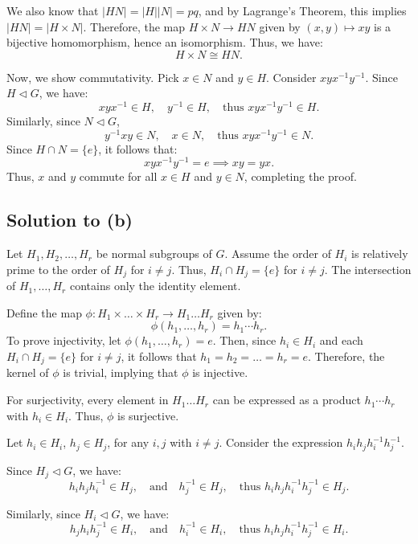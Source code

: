 \documentclass[12pt]{article}
\begin{document}
We also know that \( |HN| = |H||N| = pq \), and by Lagrange's Theorem, this implies \( |HN| = |H \times N| \). Therefore, the map \( H \times N \to HN \) given by \( (x, y) \mapsto xy \) is a bijective homomorphism, hence an isomorphism. Thus, we have:
\[
H \times N \cong HN.
\]

Now, we show commutativity. Pick \( x \in N \) and \( y \in H \). Consider \( xyx^{-1}y^{-1} \). Since \( H \triangleleft G \), we have:
\[
xyx^{-1} \in H, \quad y^{-1} \in H, \quad \text{thus } xyx^{-1}y^{-1} \in H.
\]
Similarly, since \( N \triangleleft G \), 
\[
y^{-1}xy \in N, \quad x \in N, \quad \text{thus } xyx^{-1}y^{-1} \in N.
\]
Since \( H \cap N = \{e\} \), it follows that:
\[
xyx^{-1}y^{-1} = e \implies xy = yx.
\]
Thus, \( x \) and \( y \) commute for all \( x \in H \) and \( y \in N \), completing the proof.

\subsection*{Solution to (b)}
Let \( H_1, H_2, \ldots, H_r \) be normal subgroups of \( G \). Assume the order of \( H_i \) is relatively prime to the order of \( H_j \) for \( i \neq j \). Thus, \( H_i \cap H_j = \{e\} \) for \( i \neq j \). The intersection of \( H_1, \ldots, H_r \) contains only the identity element.

Define the map \( \phi: H_1 \times \ldots \times H_r \to H_1 \ldots H_r \) given by:
\[
\phi(h_1, \ldots, h_r) = h_1 \cdots h_r.
\]
To prove injectivity, let \( \phi(h_1, \ldots, h_r) = e \). Then, since \( h_i \in H_i \) and each \( H_i \cap H_j = \{e\} \) for \( i \neq j \), it follows that \( h_1 = h_2 = \ldots = h_r = e \). Therefore, the kernel of \( \phi \) is trivial, implying that \( \phi \) is injective.

For surjectivity, every element in \( H_1 \ldots H_r \) can be expressed as a product \( h_1 \cdots h_r \) with \( h_i \in H_i \). Thus, \( \phi \) is surjective.

Let \( h_i \in H_i \), \( h_j \in H_j \), for any \( i, j \) with \( i \neq j \). Consider the expression \( h_i h_j h_i^{-1} h_j^{-1} \).

Since \( H_j \triangleleft G \), we have:
\[
h_i h_j h_i^{-1} \in H_j, \quad \text{and} \quad h_j^{-1} \in H_j, \quad \text{thus } h_i h_j h_i^{-1} h_j^{-1} \in H_j.
\]

Similarly, since \( H_i \triangleleft G \), we have:
\[
h_j h_i h_j^{-1} \in H_i, \quad \text{and} \quad h_i^{-1} \in H_i, \quad \text{thus } h_i h_j h_i^{-1} h_j^{-1} \in H_i.
\]
\end{document}

